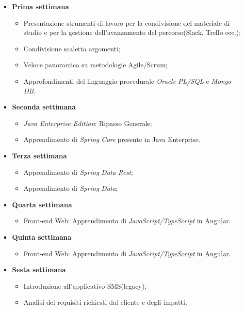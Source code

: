 \begin{itemize}
	\item \textbf{Prima settimana}
		\begin{itemize}
			\item Presentazione strumenti di lavoro per la condivisione del materiale di
			studio e per la gestione dell’avanzamento del percorso(Slack, Trello ecc.);
			\item Condivisione scaletta argomenti;
			\item Veloce panoramica su metodologie Agile/Scrum;
			\item Approfondimenti del linguaggio procedurale \textit{Oracle PL/SQL} e \textit{Mongo
			DB}.
		\end{itemize}
	\item \textbf{Seconda settimana}
		\begin{itemize}
			\item \textit{Java Enterprise Edition}: Ripasso Generale;
			\item Apprendimento di \textit{Spring Core} presente in Java Enterprise.
		\end{itemize}
	\item \textbf{Terza settimana}
		\begin{itemize}
			\item Apprendimento di \textit{Spring Data Rest};
			\item Apprendimento di \textit{Spring Data};
		\end{itemize}	
	\item \textbf{Quarta settimana}\\
		\begin{itemize}
			\item Front-end Web: Apprendimento di \textit{JavaScript/\hyperref[typescript]{TypeScript}} in \hyperref[angular]{Angular}.
		\end{itemize}	
	\item \textbf{Quinta settimana}	
		\begin{itemize}
			\item Front-end Web: Apprendimento di \textit{JavaScript/\hyperref[typescript]{TypeScript}} in \hyperref[angular]{Angular}.
		\end{itemize}
	\item \textbf{Sesta settimana}
		\begin{itemize}
			\item Introduzione all’applicativo SMS(legacy);
			\item Analisi dei requisiti richiesti dal cliente e degli impatti;

\end{itemize}
\end{itemize}
